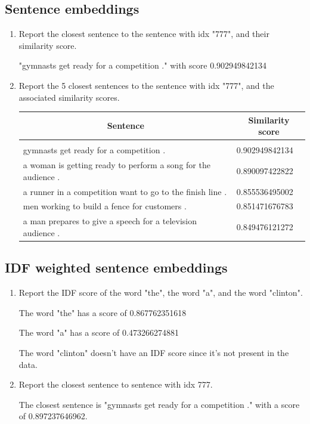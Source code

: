 \documentclass{article} %
\begin{document}
\newpage
\subsection{Sentence embeddings}

\begin{enumerate}
    \item
    Report the closest sentence to the sentence with idx "777", and their
    similarity score.

    "gymnasts get ready for a competition ." with score 0.902949842134

    \item
    Report the 5 closest sentences to the sentence with idx "777", and the
    associated similarity scores.

    \begin{table}[h]
    \label{sample-table}
    \begin{center}
    \begin{tabular}{ll}
    \multicolumn{1}{c}{\bf Sentence} & \multicolumn{1}{c}{\bf Similarity score}
    \\ \hline \\
    gymnasts get ready for a competition . & 0.902949842134 \\
    a woman is getting ready to perform a song for the audience . & 0.890097422822 \\
    a runner in a competition want to go to the finish line . & 0.855536495002 \\
    men working to build a fence for customers . & 0.851471676783 \\
    a man prepares to give a speech for a television audience . & 0.849476121272 \\
    \end{tabular}
    \end{center}
    \end{table}
\end{enumerate}

\subsection{IDF weighted sentence embeddings}

\begin{enumerate}
    \item
    Report the IDF score of the word "the", the word "a", and the word "clinton".

    The word "the" has a score of 0.867762351618

    The word "a" has a score of 0.473266274881

    The word "clinton" doesn't have an IDF score since it's not present in the data.

    \item
    Report the closest sentence to sentence with idx 777.

    The closest sentence is "gymnasts get ready for a competition ." with a score of 0.897237646962.
\end{enumerate}
\end{document}
